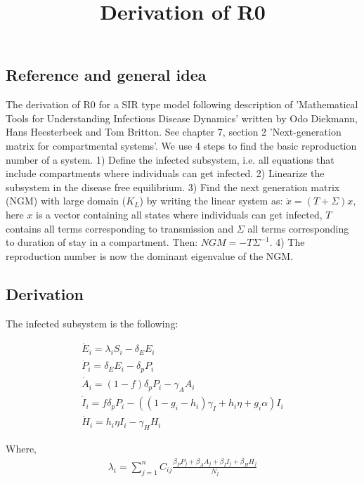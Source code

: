 \documentclass{article}
\title{Derivation of R0}
\begin{document}
\maketitle

\subsection*{Reference and general idea}

The derivation of R0 for a SIR type model following description of 'Mathematical Tools for Understanding Infectious Disease Dynamics' written by Odo Diekmann, Hans Heesterbeek and Tom Britton. 
See chapter 7, section 2 'Next-generation matrix for compartmental systems'. 
We use 4 steps to find the basic reproduction number of a system.
1) Define the infected subsystem, i.e. all equations that include compartments where individuals can get infected. 
2) Linearize the subsystem in the disease free equilibrium. 
3) Find the next generation matrix (NGM) with large domain ($K_L$) by writing the linear system as: $\dot{x} = (T + \Sigma) x$, here $x$ is a vector containing all states where individuals can get infected, $T$ contains all terms corresponding to transmission and $\Sigma$ all terms corresponding to duration of stay in a compartment. Then: $NGM = -T \Sigma^{-1}. $
4) The reproduction number is now the dominant eigenvalue of the NGM. 


\subsection*{Derivation}

The infected subsystem is the following: 

\begin{gather*}
    \dot{E}_i =  \lambda_i S_i - \delta_E E_i \\
    \dot{P}_i = \delta_E E_i - \delta_p P_i \\
    \dot{A}_i = (1-f) \delta_p P_i - \gamma_A A_i \\
    \dot{I}_i = f \delta_p P_i - ((1-g_i-h_i) \gamma_{I} + h_i \eta + g_i \alpha) I_i \\   
    \dot{H}_i = h_i \eta I_i - \gamma_H H_i   
\end{gather*}

Where, 
\begin{gather*}
   \lambda_i = \sum_{j = 1}^n C_{ij} \frac{\beta_P P_j + \beta_A A_j + \beta_I I_j + \beta_H H_j}{N_j}
\end{gather*}
\end{document}
